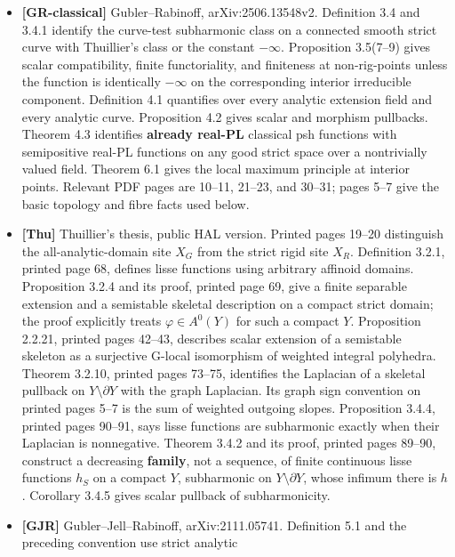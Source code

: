 \documentclass[
  11pt,
]{article}
\providecommand{\tightlist}{%
  \setlength{\itemsep}{0pt}\setlength{\parskip}{0pt}}
\begin{document}
\begin{itemize}
\tightlist
\item
  \textbf{{[}GR-classical{]}} Gubler--Rabinoff, arXiv:2506.13548v2.
  Definition 3.4 and 3.4.1 identify the curve-test subharmonic class on
  a connected smooth strict curve with Thuillier's class or the constant
  \(-\infty\). Proposition 3.5(7--9) gives scalar compatibility, finite
  functoriality, and finiteness at non-rig-points unless the function is
  identically \(-\infty\) on the corresponding interior irreducible
  component. Definition 4.1 quantifies over every analytic extension
  field and every analytic curve. Proposition 4.2 gives scalar and
  morphism pullbacks. Theorem 4.3 identifies \textbf{already real-PL}
  classical psh functions with semipositive real-PL functions on any
  good strict space over a nontrivially valued field. Theorem 6.1 gives
  the local maximum principle at interior points. Relevant PDF pages are
  10--11, 21--23, and 30--31; pages 5--7 give the basic topology and
  fibre facts used below.
\item
  \textbf{{[}Thu{]}} Thuillier's thesis, public HAL version. Printed
  pages 19--20 distinguish the all-analytic-domain site \(X_G\) from the
  strict rigid site \(X_R\). Definition 3.2.1, printed page 68, defines
  lisse functions using arbitrary affinoid domains. Proposition 3.2.4
  and its proof, printed page 69, give a finite separable extension and
  a semistable skeletal description on a compact strict domain; the
  proof explicitly treats \(\varphi\in A^0(Y)\) for such a compact
  \(Y\). Proposition 2.2.21, printed pages 42--43, describes scalar
  extension of a semistable skeleton as a surjective G-local isomorphism
  of weighted integral polyhedra. Theorem 3.2.10, printed pages 73--75,
  identifies the Laplacian of a skeletal pullback on
  \(Y\setminus\partial Y\) with the graph Laplacian. Its graph sign
  convention on printed pages 5--7 is the sum of weighted outgoing
  slopes. Proposition 3.4.4, printed pages 90--91, says lisse functions
  are subharmonic exactly when their Laplacian is nonnegative. Theorem
  3.4.2 and its proof, printed pages 89--90, construct a decreasing
  \textbf{family}, not a sequence, of finite continuous lisse functions
  \(h_S\) on a compact \(Y\), subharmonic on \(Y\setminus\partial Y\),
  whose infimum there is \(h\). Corollary 3.4.5 gives scalar pullback of
  subharmonicity.
\item
  \textbf{{[}GJR{]}} Gubler--Jell--Rabinoff, arXiv:2111.05741.
  Definition 5.1 and the preceding convention use strict analytic

\end{itemize}
\end{document}

